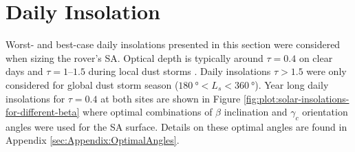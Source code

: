 \section{Daily Insolation}
Worst- and best-case daily insolations presented in this section were considered when sizing the rover's \ac{SA}. Optical depth is typically around $\tau = 0.4$ on clear days  and $\tau = 1–1.5$ during local dust storms . Daily insolations $\tau > 1.5$ were only considered for global dust storm season ($\SI{180}{\degree} < L_{s} < \SI{360}{\degree}$). Year long daily insolations for $\tau = 0.4$ at both sites are shown in Figure \ref{fig:plot:solar-insolations-for-different-beta} where optimal combinations of $\beta$ inclination and $\gamma_c$ orientation angles were used for the \ac{SA} surface. Details on these optimal angles are found in Appendix \ref{sec:Appendix:OptimalAngles}.

